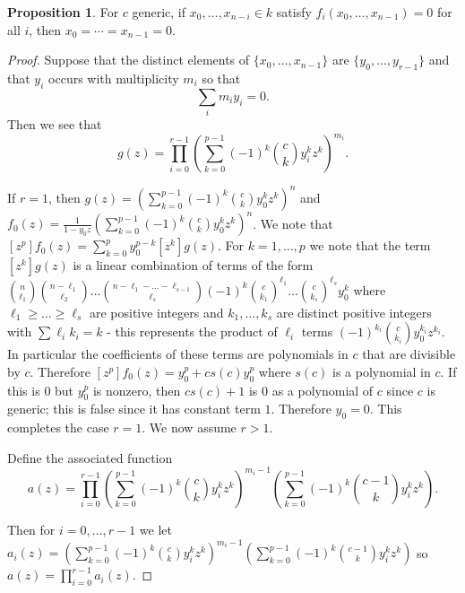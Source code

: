 \documentclass{amsart}
\theoremstyle{definition}
\newtheorem{prop}[thm]{Proposition}
\begin{document}
\begin{prop} 
For $c$ generic, if $x_0, \ldots, x_{n - i} \in k$ satisfy $f_i(x_0, \ldots, x_{n - 1}) = 0$ for all $i$, then $x_0 = \cdots = x_{n - 1} = 0$.
\end{prop}
\begin{proof}
Suppose that the distinct elements of $\{x_0, \ldots, x_{n - 1}\}$ are $\{y_0, \ldots, y_{r - 1}\}$ and that $y_i$ occurs with multiplicity $m_i$ so that 
\[
\sum_i m_i y_i = 0.
\]
Then we see that 
\[
g(z) = \prod_{i = 0}^{r - 1} \left(\sum_{k = 0}^{p - 1} (-1)^k\binom{c}{k} y_i^k z^k\right)^{m_i}.
\]

If $r=1$, then $g(z)= \left(\sum_{k=0}^{p-1} (-1)^k \binom{c}{k} y_0^kz^k\right)^n$ and $f_0(z)=\frac{1}{1-y_0z}\left(\sum_{k=0}^{p-1} (-1)^k \binom{c}{k} y_0^kz^k\right)^n$. We note that $[z^p]f_0(z)=\sum_{k=0}^p y_0^{p-k}[z^k]g(z)$. For $k=1,\dots,p$ we note that the term $[z^k]g(z)$ is a linear combination of terms of the form $\binom{n}{\ell_1}\binom{n-\ell_1}{\ell_2}\dots\binom{n-\ell_1-\dots-\ell_{s-1}}{\ell_s}(-1)^k\binom{c}{k_1}^{\ell_1}\dots\binom{c}{k_s}^{\ell_s}y_0^k$ where $\ell_1\ge\dots\ge\ell_s$ are positive integers and $k_1,\dots,k_s$ are distinct positive integers with $\sum \ell_ik_i=k$ - this represents the product of $\ell_i$ terms $ (-1)^{k_i}\binom{c}{k_i} y_0^{k_i} z^{k_i}$. In particular the coefficients of these terms are polynomials in $c$ that are divisible by $c$. Therefore $[z^p]f_0(z)=y_0^p+cs(c )y_0^p$ where $s(c )$ is a polynomial in $c$. If this is $0$ but $y_0^p$ is nonzero, then $cs(c )+1$ is $0$ as a polynomial of $c$ since $c$ is generic; this is false since it has constant term $1$. Therefore $y_0=0$. This completes the case $r=1$. We now assume $r>1$.


Define the associated function
\[
a(z) = \prod_{i = 0}^{r - 1} \left(\sum_{k = 0}^{p - 1} (-1)^k\binom{c}{k} y_i^k z^k\right)^{m_i - 1}\left(\sum_{k = 0}^{p - 1} (-1)^k\binom{c - 1}{k} y_i^k z^k\right).
\]






Then for $i=0,\dots,r-1$ we let $a_i(z)=\left(\sum_{k = 0}^{p - 1} (-1)^k\binom{c}{k} y_i^k z^k\right)^{m_i - 1}\left(\sum_{k = 0}^{p - 1} (-1)^k\binom{c - 1}{k} y_i^k z^k\right)$ so $a(z)=\prod_{i=0}^{r-1} a_i(z)$. 



\end{proof}
\end{document}
